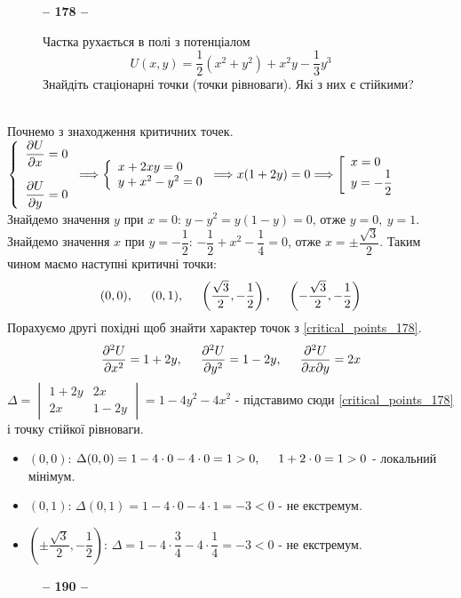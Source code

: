 \documentclass[a4paper,12pt]{article}
\newenvironment{task}[1]{\begin{figure*}[htp]\begin{framed}\begin{center}\textbf{-- {#1} --}\end{center}}{\end{framed}\end{figure*}}
\newcommand\tab [1][0.5cm]{\hspace*{#1}}
\begin{document}
\begin{justify}
\begin{task}{178}
			Частка рухається в полі з потенціалом
			$$U(x,y)=\dfrac12(x^2+y^2)+x^2y-\dfrac13y
			^3$$
			Знайдіть стаціонарні точки (точки рівноваги). Які з них є стійкими?
		\end{task}\\
		Почнемо з знаходження критичних точек.\\
		$\left\{\begin{array}{l}
			\dfrac{\partial U}{\partial x}=0\\\\\dfrac{\partial U}{\partial y}=0
		\end{array}\right.\Longrightarrow\left\{\begin{array}{l}
			x+2xy=0\\y+x^2-y^2=0
		\end{array} \right.\Longrightarrow x(1+2y)=0\Longrightarrow\left[\begin{array}{l}
			x=0\\y=-\dfrac12
		\end{array} \right.\\$
		Знайдемо значення $y$ при $x=0$: $y-y^2=y(1-y)=0$, отже $y=0,\> y=1$. Знайдемо значення $x$ при $y=-\dfrac12$: $-\dfrac12+x^2-\dfrac14=0$, отже $x=\pm\dfrac{\sqrt{3}}{2}$. Таким чином маємо наступні критичні точки:
		\begin{equation}
			(0,0),\tab(0,1),\tab\left(\dfrac{\sqrt{3}}{2},-\dfrac12\right),\tab\left(-\dfrac{\sqrt{3}}{2},-\dfrac12\right)
			\label{critical_points_178}
		\end{equation}
		Порахуємо другі похідні щоб знайти характер точок з \cref{critical_points_178}. $$\dfrac{\partial^2 U}{\partial x^2}=1+2y,\tab \dfrac{\partial^2 U}{\partial y^2}=1-2y,\tab \dfrac{\partial^2 U}{\partial x\partial y}=2x$$
		$\Delta=
		\begin{vmatrix}
			1+2y&2x\\2x&1-2y
		\end{vmatrix}=1-4y^2-4x^2$ - підставимо сюди \cref{critical_points_178} і  точку стійкої рівноваги.
		\begin{itemize}
			\item $(0,0)$: $\Delta(0,0)=1-4\cdot0-4\cdot0=1>0,\tab 1+2\cdot0=1>0$ - локальний мінімум.
			\item $(0,1)$: $\Delta(0,1)=1-4\cdot0-4\cdot1=-3<0$ - не екстремум.
			\item $\left(\pm\dfrac{\sqrt{3}}{2},-\dfrac12\right)$: $\Delta=1-4\cdot\dfrac34-4\cdot\dfrac14=-3<0$ - не екстремум.
		\end{itemize}
		\begin{task}{190}

\end{task}
\end{justify}
\end{document}
